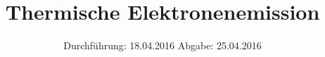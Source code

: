 
\subject{504}
\title{Thermische Elektronenemission}
\date{
  Durchführung: 18.04.2016
  \hspace{3em}
  Abgabe: 25.04.2016
}



\maketitle
\newpage
\mbox{}
\newpage
\thispagestyle{empty}
\tableofcontents
\newpage






\nocite{numpy}
\nocite{matplotlib}
\nocite{uncertainties}
\printbibliography


